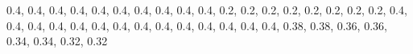 \documentclass{article}
\newcommand*{\cutoutcross}{%
  0.4\textwidth, 0.4\textwidth,
  0.4\textwidth, 0.4\textwidth,
  0.4\textwidth, 0.4\textwidth,
  0.4\textwidth, 0.4\textwidth,
  0.4\textwidth, 0.4\textwidth,
  0.2\textwidth, 0.2\textwidth,
  0.2\textwidth, 0.2\textwidth,  
  0.2\textwidth, 0.2\textwidth,
  0.2\textwidth, 0.2\textwidth,
  0.4\textwidth, 0.4\textwidth,
  0.4\textwidth, 0.4\textwidth,
  0.4\textwidth, 0.4\textwidth,
  0.4\textwidth, 0.4\textwidth,
  0.4\textwidth, 0.4\textwidth,
  0.4\textwidth, 0.4\textwidth,  
  0.4\textwidth, 0.4\textwidth,  
  0.38\textwidth, 0.38\textwidth,  
  0.36\textwidth, 0.36\textwidth,
  0.34\textwidth, 0.34\textwidth,
  0.32\textwidth, 0.32\textwidth
}
\begin{document}

\begin{shapedcutout}{7}{20}{\cutoutcross}
\end{shapedcutout}
\end{document}
